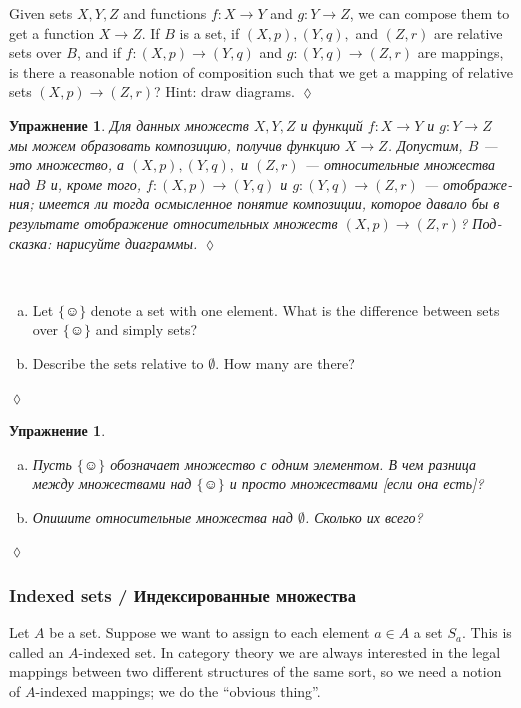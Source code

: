 \documentclass[a4paper]{book}
\def\singleton{\{\smiley\}}
\def\to{\rightarrow}
\def\taking{\colon}
\theoremstyle{myth}
\newtheorem{excENG}[envENG]{\begin{english}Exercise\end{english}}
\newenvironment{exerciseENG}{\begin{excENG}}{\hspace*{\fill}$\lozenge$\end{excENG}}
\newtheorem{excRUS}[envRUS]{Упражнение}
\newenvironment{exerciseRUS}{\begin{excRUS}}{\hspace*{\fill}$\lozenge$\end{excRUS}}
\def\sexc{\begin{enumerate}[a.)]\setlength{\itemsep}{.1cm}\setlength{\parskip}{.1cm}\item}
\def\next{\item}
\def\endsexc{\end{enumerate}}
\begin{document}
\begin{russian}
\begin{exerciseENG}
Given sets $X,Y,Z$ and functions $f\taking X\to Y$ and $g\taking Y\to Z$, we can compose them to get a function $X\to Z$. If $B$ is a set, if $(X,p), (Y,q),$ and $(Z,r)$ are relative sets over $B$, and if $f\taking (X,p)\to (Y,q)$ and $g\taking (Y,q)\to (Z,r)$ are mappings, is there a reasonable notion of composition such that we get a mapping of relative sets $(X,p)\to (Z,r)$? Hint: draw diagrams.
\end{exerciseENG}

\begin{exerciseRUS}
Для данных множеств $X,Y,Z$ и функций $f\taking X\to Y$ и $g\taking Y\to Z$ мы можем образовать композицию, получив функцию $X\to Z$. Допустим, $B$ — это множество, а $(X,p), (Y,q),$ и $(Z,r)$ — относительные множества над $B$ и, кроме того, $f\taking (X,p)\to (Y,q)$ и $g\taking (Y,q)\to (Z,r)$ — отображения; имеется ли тогда осмысленное понятие композиции, которое давало бы в результате отображение относительных множеств $(X,p)\to (Z,r)$? Подсказка: нарисуйте диаграммы.
\end{exerciseRUS}

\begin{exerciseENG}~
\sexc Let $\singleton$ denote a set with one element. What is the difference between sets over $\singleton$ and simply sets?
\next Describe the sets relative to $\emptyset$. How many are there?
\endsexc
\end{exerciseENG}

\begin{exerciseRUS}~
\sexc Пусть $\singleton$ обозначает множество с одним элементом. В чем разница между множествами над $\singleton$ и просто множествами [если она есть]?
\next Опишите относительные множества над $\emptyset$. Сколько их всего?
\endsexc
\end{exerciseRUS}


\subsubsection{Indexed sets / Индексированные множества}\label{sec:indexed sets}

Let $A$ be a set. Suppose we want to assign to each element $a\in A$ a set $S_a$. This is called an $A$-indexed set. In category theory we are always interested in the legal mappings between two different structures of the same sort, so we need a notion of $A$-indexed mappings; we do the “obvious thing”.


\end{russian}
\end{document}
